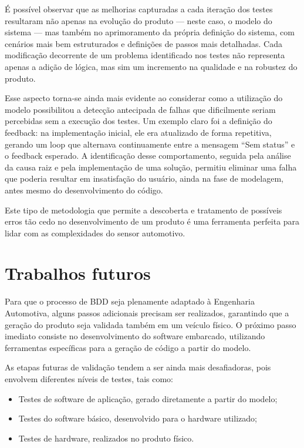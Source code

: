 É possível observar que as melhorias capturadas a cada iteração dos testes resultaram não apenas na evolução do produto — neste caso, o modelo do sistema — mas também 
no aprimoramento da própria definição do sistema, com cenários mais bem estruturados e definições de passos mais detalhadas. Cada modificação decorrente de um problema 
identificado nos testes não representa apenas a adição de lógica, mas sim um incremento na qualidade e na robustez do produto.

Esse aspecto torna-se ainda mais evidente ao considerar como a utilização do modelo possibilitou a detecção antecipada de falhas que dificilmente seriam percebidas sem 
a execução dos testes. Um exemplo claro foi a definição do feedback: na implementação inicial, ele era atualizado de forma repetitiva, gerando um loop que alternava 
continuamente entre a mensagem ``Sem status'' e o feedback esperado. A identificação desse comportamento, seguida pela análise da causa raiz e pela implementação de uma 
solução, permitiu eliminar uma falha que poderia resultar em insatisfação do usuário, ainda na fase de modelagem, antes mesmo do desenvolvimento do código.

Este tipo de metodologia que permite a descoberta e tratamento de possíveis erros tão cedo no desenvolvimento de um produto é uma ferramenta perfeita para lidar com as 
complexidades do sensor automotivo.

\section{Trabalhos futuros}

Para que o processo de BDD seja plenamente adaptado à Engenharia Automotiva, alguns passos adicionais precisam ser realizados, garantindo que a geração do 
produto seja validada também em um veículo físico. O próximo passo imediato consiste no desenvolvimento do software embarcado, utilizando ferramentas específicas 
para a geração de código a partir do modelo.

As etapas futuras de validação tendem a ser ainda mais desafiadoras, pois envolvem diferentes níveis de testes, tais como:
\begin{itemize}
    \item Testes de software de aplicação, gerado diretamente a partir do modelo;
    \item Testes do software básico, desenvolvido para o hardware utilizado;
    \item Testes de hardware, realizados no produto físico.
\end{itemize}
